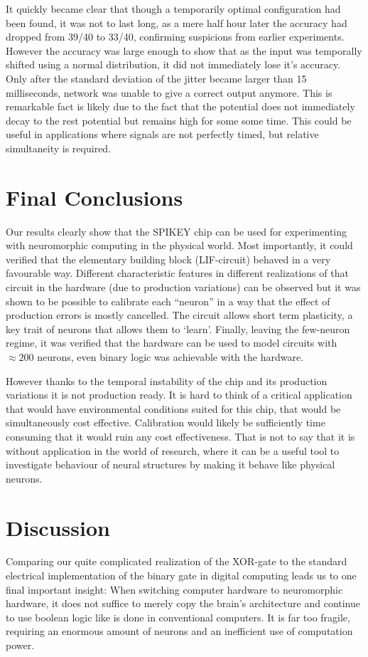 \documentclass[10pt,a4paper]{article}
\begin{document}
It quickly became clear that though a temporarily optimal configuration had been
found, it was not to last long, as a mere half hour later the accuracy had
dropped from 39/40 to 33/40, confirming suspicions from earlier experiments.
However the accuracy was large enough to show that as the input was temporally
shifted using a normal distribution, it did not immediately lose it's accuracy.
Only after the standard deviation of the jitter became larger than 15
milliseconds, network was unable to give a correct output anymore. This is
remarkable fact is likely due to the fact that the potential does not
immediately decay to the rest potential but remains high for some some time.
This could be useful in applications where signals are not perfectly timed, but
relative simultaneity is required.


\section{Final Conclusions}
Our results clearly show that the SPIKEY chip can be used for experimenting with
neuromorphic computing in the physical world. Most importantly, it could
verified that the elementary building block (LIF-circuit) behaved in a very
favourable way. Different characteristic features in different realizations of
that circuit in the hardware (due to production variations) can be observed but it
was shown to be possible to calibrate each  ``neuron'' in a way that the effect
of production errors is mostly cancelled. The circuit allows short term
plasticity,  a key trait of neurons that allows them to `learn'.  Finally,
leaving the few-neuron regime, it was verified that the hardware can be used to
model circuits with $\approx 200$ neurons, even binary logic was achievable with
the hardware.

However thanks to the temporal instability of the chip and its production
variations it is not production ready. It is hard to think of a critical
application that would have environmental conditions suited for this chip, that
would be simultaneously cost effective. Calibration would likely be sufficiently
time consuming that it would ruin any cost effectiveness. That is not to say
that it is without application in the world of research, where it can be a
useful tool to investigate behaviour of neural structures by making it behave
like physical neurons.

\section{Discussion}
Comparing our quite complicated realization of the XOR-gate to the standard
electrical implementation of the binary gate in digital computing leads us to
one final important insight: When switching computer hardware to neuromorphic
hardware, it does not suffice to merely copy the brain's architecture and
continue to use boolean logic like is done in conventional computers. It is far
too fragile, requiring an enormous amount of neurons and an inefficient use of
computation power.
\end{document}
